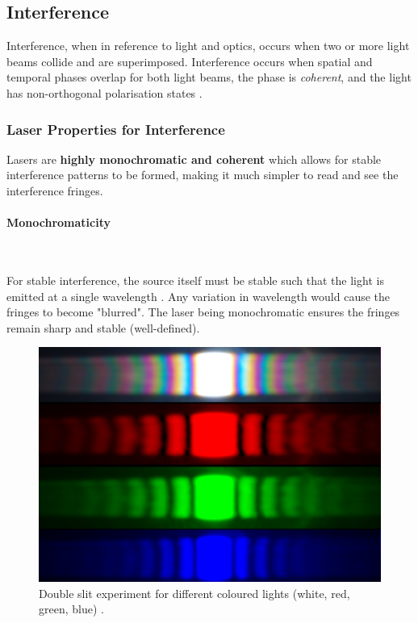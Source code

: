 \documentclass[12pt]{article}
\begin{document}
\subsection{Interference} \label{sec:1.3}

Interference, when in reference to light and optics, occurs when two or more light beams collide and are superimposed. Interference occurs when spatial and temporal phases overlap for both light beams,
the phase is \textit{coherent}, and the light has non-orthogonal polarisation states \cite{Paschotta_2005_interference}.

\subsubsection{Laser Properties for Interference} \label{sec:1.3.1}

Lasers are \textbf{highly monochromatic and coherent} which allows for stable interference patterns to be formed, making it much simpler to read and see the interference fringes.

\paragraph{Monochromaticity} \label{sec:1.3.1.1} \leavevmode\\
\vspace{-3ex}

For stable interference, the source itself must be stable such that the light is emitted at a single wavelength \cite{princelaser}.
Any variation in wavelength would cause the fringes to become "blurred". The laser being monochromatic ensures the fringes remain sharp and stable (well-defined).

\begin{figure}[H]
    \centering
    \includegraphics[width=.5\textwidth]{interference patterns.jpg}
    \caption{\centering Double slit experiment for different coloured lights (white, red, green, blue) \protect\cite{holoimg2}.}
    \label{fig:4}
\end{figure}
\end{document}
